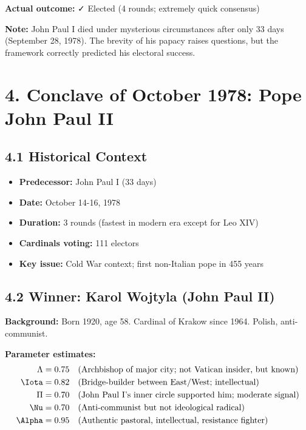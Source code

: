 \textbf{Actual outcome:} ✓ Elected (4 rounds; extremely quick consensus)

\textbf{Note:} John Paul I died under mysterious circumstances after only 33 days (September 28, 1978). The brevity of his papacy raises questions, but the framework correctly predicted his electoral success.

\section{4. Conclave of October 1978: Pope John Paul II}

\subsection{4.1 Historical Context}

\begin{itemize}
\item \textbf{Predecessor:} John Paul I (33 days)
\item \textbf{Date:} October 14-16, 1978
\item \textbf{Duration:} 3 rounds (fastest in modern era except for Leo XIV)
\item \textbf{Cardinals voting:} 111 electors
\item \textbf{Key issue:} Cold War context; first non-Italian pope in 455 years
\end{itemize}

\subsection{4.2 Winner: Karol Wojtyla (John Paul II)}

\textbf{Background:} Born 1920, age 58. Cardinal of Krakow since 1964. Polish, anti-communist.

\textbf{Parameter estimates:}
\begin{align*}
\Lambda &= 0.75 \quad \text{(Archbishop of major city; not Vatican insider, but known)} \\
\Iota &= 0.82 \quad \text{(Bridge-builder between East/West; intellectual)} \\
\Pi &= 0.70 \quad \text{(John Paul I's inner circle supported him; moderate signal)} \\
\Nu &= 0.70 \quad \text{(Anti-communist but not ideological radical)} \\
\Alpha &= 0.95 \quad \text{(Authentic pastoral, intellectual, resistance fighter)}
\end{align*}

